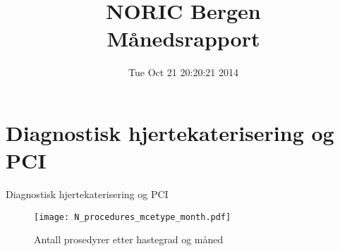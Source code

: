 \documentclass[presentation,xcolor=pdftex,dvipsnames,table]{beamer}
\title{NORIC Bergen \\Månedsrapport}\date{ Tue Oct 21 20:20:21 2014 }
\begin{document}
\maketitle



\section{Diagnostisk hjertekaterisering og PCI}

\begin{frame}
\begin{Huge}
Diagnostisk hjertekaterisering og PCI
\end{Huge}
\end{frame}




\begin{frame}
\begin{figure}
  \centering
  \caption{Antall prosedyrer etter hastegrad og måned}
\texttt{[image: N\_procedures\_mcetype\_month.pdf]}
\end{figure}\end{frame}
\end{document}
